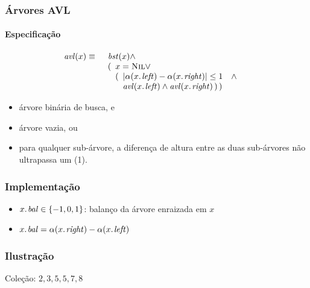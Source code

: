 \documentclass{beamer}
\begin{document}
\begin{frame}

\frametitle{Árvores AVL}
\framesubtitle{Especificação}

\begin{eqnarray*}
\id{avl}(x) & \equiv & \begin{array}[t]{l}
\id{bst}(x) \land \\
(\begin{array}[t]{l}
x = \const{Nil} \lor \\
(\begin{array}[t]{ll}
  \left| \alpha(\attrib{x}{left}) - \alpha(\attrib{x}{right}) \right| \le 1 & \land \\
  \id{avl}{(\attrib{x}{left}}) \land \id{avl}({\attrib{x}{right}})\, )\, )
\end{array}
\end{array}
\end{array}
\end{eqnarray*}

\begin{itemize}
\item árvore binária de busca, e
\item árvore vazia, ou
\item para qualquer sub-árvore, a diferença de altura entre as duas sub-árvores
  não ultrapassa um (1).
\end{itemize}

\end{frame}

\begin{frame}

\frametitle{Implementação}

\begin{itemize}
\item $\attrib{x}{bal} \in \{-1, 0, 1\}$: balanço da árvore enraizada em $x$
\item $\attrib{x}{bal} = \alpha(\attrib{x}{right}) - \alpha(\attrib{x}{left})$
\end{itemize}

\end{frame}

\begin{frame}

\frametitle{Ilustração}

  Coleção: $2, 3, 5, 5, 7, 8$

  \begin{itemize}
  \end{itemize}

\end{frame}
\end{document}
